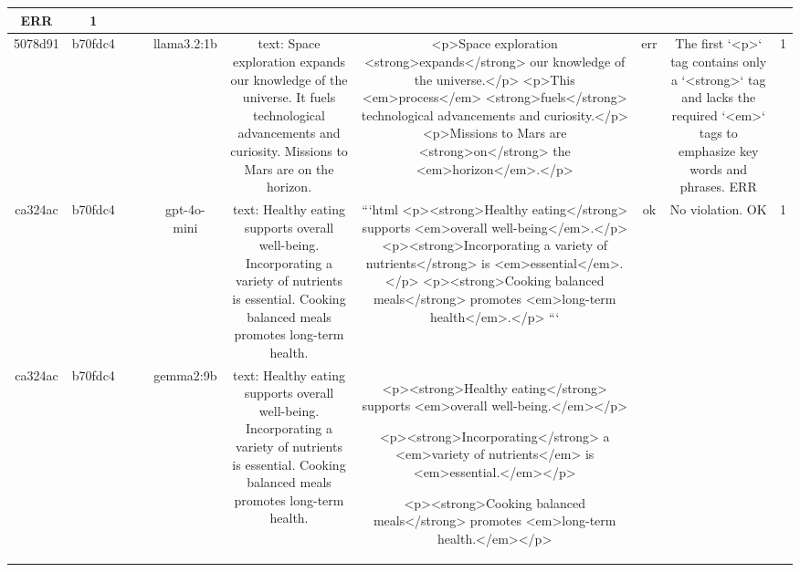 \begin{table}[h!]
\begin{tabular}{|c|c|c|c|c|c|c|c|c|c|}
ERR & 1\\
\hline
5078d91 & b70fdc4 &  &  & llama3.2:1b & text: Space exploration expands our knowledge of the universe. It fuels technological advancements and curiosity. Missions to Mars are on the horizon. & <p>Space exploration <strong>expands</strong> our knowledge of the universe.</p>
<p>This <em>process</em> <strong>fuels</strong> technological advancements and curiosity.</p>
<p>Missions to Mars are <strong>on</strong> the <em>horizon</em>.</p> & err & The first `<p>` tag contains only a `<strong>` tag and lacks the required `<em>` tags to emphasize key words and phrases.
ERR & 1\\
\hline
ca324ac & b70fdc4 &  &  & gpt-4o-mini & text: Healthy eating supports overall well-being. Incorporating a variety of nutrients is essential. Cooking balanced meals promotes long-term health. & ```html
<p><strong>Healthy eating</strong> supports <em>overall well-being</em>.</p>
<p><strong>Incorporating a variety of nutrients</strong> is <em>essential</em>.</p>
<p><strong>Cooking balanced meals</strong> promotes <em>long-term health</em>.</p>
``` & ok & No violation.
OK & 1\\
\hline
ca324ac & b70fdc4 &  &  & gemma2:9b & text: Healthy eating supports overall well-being. Incorporating a variety of nutrients is essential. Cooking balanced meals promotes long-term health. & <p><strong>Healthy eating</strong> supports <em>overall well-being.</em></p>

<p><strong>Incorporating</strong> a <em>variety of nutrients</em> is <em>essential.</em></p>

<p><strong>Cooking balanced meals</strong> promotes <em>long-term health.</em></p>   



\end{tabular}
\end{table}
